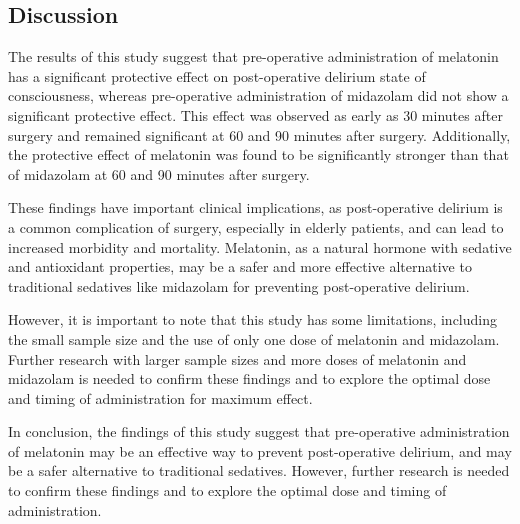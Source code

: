 \documentclass[
]{article}
\begin{document}
\hypertarget{discussion}{%
\subsection{Discussion}\label{discussion}}

The results of this study suggest that pre-operative administration of
melatonin has a significant protective effect on post-operative delirium
state of consciousness, whereas pre-operative administration of
midazolam did not show a significant protective effect. This effect was
observed as early as 30 minutes after surgery and remained significant
at 60 and 90 minutes after surgery. Additionally, the protective effect
of melatonin was found to be significantly stronger than that of
midazolam at 60 and 90 minutes after surgery.

These findings have important clinical implications, as post-operative
delirium is a common complication of surgery, especially in elderly
patients, and can lead to increased morbidity and mortality. Melatonin,
as a natural hormone with sedative and antioxidant properties, may be a
safer and more effective alternative to traditional sedatives like
midazolam for preventing post-operative delirium.

However, it is important to note that this study has some limitations,
including the small sample size and the use of only one dose of
melatonin and midazolam. Further research with larger sample sizes and
more doses of melatonin and midazolam is needed to confirm these
findings and to explore the optimal dose and timing of administration
for maximum effect.

In conclusion, the findings of this study suggest that pre-operative
administration of melatonin may be an effective way to prevent
post-operative delirium, and may be a safer alternative to traditional
sedatives. However, further research is needed to confirm these findings
and to explore the optimal dose and timing of administration.
\end{document}
